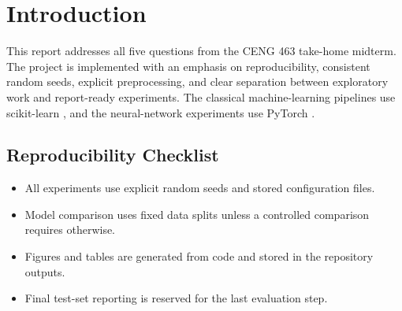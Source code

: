 \section{Introduction}

This report addresses all five questions from the CENG 463 take-home midterm. The project is implemented with an emphasis on reproducibility, consistent random seeds, explicit preprocessing, and clear separation between exploratory work and report-ready experiments. The classical machine-learning pipelines use scikit-learn \cite{pedregosa2011sklearn}, and the neural-network experiments use PyTorch \cite{paszke2019pytorch}.

\subsection{Reproducibility Checklist}

\begin{itemize}
  \item All experiments use explicit random seeds and stored configuration files.
  \item Model comparison uses fixed data splits unless a controlled comparison requires otherwise.
  \item Figures and tables are generated from code and stored in the repository outputs.
  \item Final test-set reporting is reserved for the last evaluation step.
\end{itemize}
